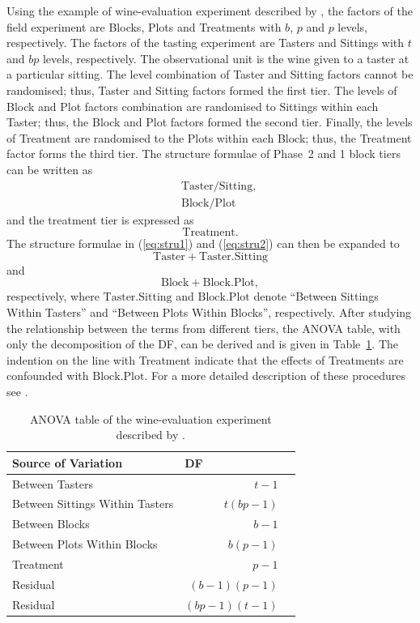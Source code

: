 \documentclass[11pt,a4paper]{article}
\begin{document}
Using the example of wine-evaluation experiment described by \cite{Brien1983}, the factors of the field experiment are Blocks, Plots and Treatments with $b$, $p$ and $p$ levels, respectively. The factors of the tasting experiment are Tasters and Sittings with $t$ and $bp$ levels, respectively. The observational unit is the wine given to a taster at a particular sitting. The level combination of Taster and Sitting factors cannot be randomised; thus, Taster and Sitting factors formed the first tier. The levels of Block and Plot factors combination are randomised to Sittings within each Taster; thus, the Block and Plot factors formed the second tier. Finally, the levels of Treatment are randomised to the Plots within each Block; thus, the Treatment factor forms the third tier. The structure formulae of Phase~2 and 1 block tiers can be written as
\begin{eqnarray}
\label{eq:stru1}&&\mathrm{Taster/Sitting},\\
\label{eq:stru2}&&\mathrm{Block/Plot}
\end{eqnarray}
and the treatment tier is expressed as
\begin{equation}\label{eq:stru3}
\mathrm{Treatment.}
\end{equation}
The structure formulae in (\ref{eq:stru1}) and (\ref{eq:stru2}) can then be expanded to 
\begin{equation}\label{eq:stru1expanded}
\mathrm{Taster + Taster.Sitting}
\end{equation}
and 
\begin{equation}\label{eq:stru2expanded}
\mathrm{Block + Block.Plot},
\end{equation}
respectively, where $\mathrm{Taster.Sitting}$ and $\mathrm{Block.Plot}$ denote ``Between Sittings Within Tasters'' and ``Between Plots Within Blocks'', respectively. After studying the relationship between the terms from different tiers, the ANOVA table, with only the decomposition of the DF, can be derived and is given in Table~\ref{tab:Brien1983}. The indention on the line with Treatment indicate that the effects of Treatments are confounded with $\mathrm{Block.Plot}$. For a more detailed description of these procedures see \cite{Brien1983}.

\begin{table}[ht]
\centering
\caption{ANOVA table of the wine-evaluation experiment described by \cite{Brien1983}.}
\begin{tabular}{lrl} 
\toprule 
\multicolumn{1}{l}{\textbf{Source of Variation}} & \multicolumn{1}{l}{\textbf{DF}} \\ 
\midrule 
Between Tasters & $t-1$  \\ 
Between Sittings Within Tasters & $t(bp-1)$ \\  
\quad Between Blocks  & $b-1$  \\ 
\quad Between Plots Within Blocks & $b(p-1)$ \\ 
\quad \quad Treatment & $p-1$  \\ 
\quad \quad Residual & $(b-1)(p-1)$ \\ 
\quad Residual & $(bp-1)(t-1)$ \\ 
\bottomrule 
\end{tabular}
\label{tab:Brien1983} 
\end{table} 
\end{document}
